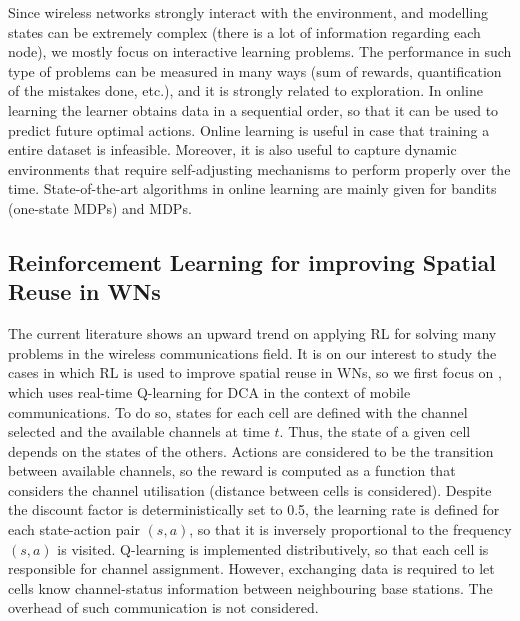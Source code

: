 \documentclass[12pt, a4paper,twoside]{tesi_upf}
\begin{document}
				Since wireless networks strongly interact with the environment, and modelling states can be extremely complex (there is a lot of information regarding each node), we mostly focus on interactive learning problems. The performance in such type of problems can be measured in many ways (sum of rewards, quantification of the mistakes done, etc.), and it is strongly related to exploration. In online learning the learner obtains data in a sequential order, so that it can be used to predict future optimal actions. Online learning is useful in case that training a entire dataset is infeasible. Moreover, it is also useful to capture dynamic environments that require self-adjusting mechanisms to perform properly over the time. State-of-the-art algorithms in online learning are mainly given for bandits (one-state MDPs) and MDPs.	
		
			\subsection{Reinforcement Learning for improving Spatial Reuse in WNs}		
			\label{section:rl_to_wns}
				The current literature shows an upward trend on applying RL for solving many problems in the wireless communications field. It is on our interest to study the cases in which RL is used to improve spatial reuse in WNs, so we first focus on \cite{nie1999q}, which uses real-time Q-learning for DCA in the context of mobile communications. To do so, states for each cell are defined with the channel selected and the available channels at time $t$. Thus, the state of a given cell depends on the states of the others. Actions are considered to be the transition between available channels, so the reward is computed as a function that considers the channel utilisation (distance between cells is considered). Despite the discount factor is deterministically set to 0.5, the learning rate is defined for each state-action pair $(s,a)$, so that it is inversely proportional to the frequency $(s,a)$ is visited. Q-learning is implemented distributively, so that each cell is responsible for channel assignment. However, exchanging data is required to let cells know channel-status information between neighbouring base stations. The overhead of such communication is not considered. 
				
\end{document}
